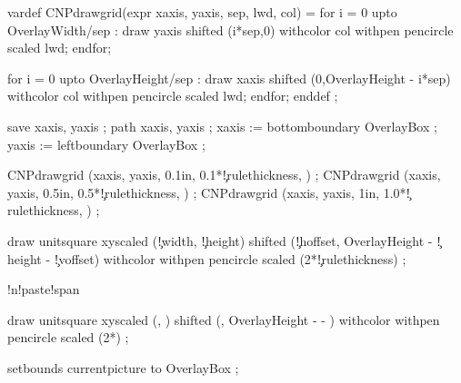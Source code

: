 
\unprotect

\setupcolors[state=start]


\startMPinclusions[+]
  vardef CNPdrawgrid(expr xaxis, yaxis, sep, lwd, col) =
    for i = 0 upto OverlayWidth/sep :
      draw yaxis shifted (i*sep,0) withcolor col withpen pencircle scaled lwd;
    endfor; 

    for i = 0 upto OverlayHeight/sep :
      draw xaxis shifted (0,OverlayHeight - i*sep) withcolor col withpen pencircle scaled lwd;
    endfor; 
  enddef ;
\stopMPinclusions

  save xaxis, yaxis ; path xaxis, yaxis ;
  xaxis := bottomboundary OverlayBox ;
  yaxis := leftboundary   OverlayBox ;

  CNPdrawgrid (xaxis, yaxis, 0.1in, 0.1*\MPvar\c!rulethickness, ) ;
  CNPdrawgrid (xaxis, yaxis, 0.5in, 0.5*\MPvar\c!rulethickness, ) ;
  CNPdrawgrid (xaxis, yaxis, 1in,   1.0*\MPvar\c!rulethickness, ) ;

  draw unitsquare xyscaled (\MPvar\c!width, \MPvar\c!height) 
       shifted (\MPvar\c!hoffset, OverlayHeight - \MPvar\c!height - \MPvar\c!voffset) 
       withcolor 
       withpen pencircle scaled (2*\MPvar\c!rulethickness) ;

  \ifconditional\cut!n!paste!span

  draw unitsquare xyscaled (, ) 
       shifted (, OverlayHeight -  - ) 
       withcolor 
       withpen pencircle scaled (2*) ;
  \fi

  setbounds currentpicture to OverlayBox ;

\stopuseMPgraphic



